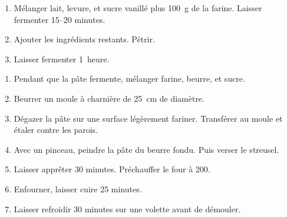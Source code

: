 

\begin{ingredients}
\end{ingredients}



\begin{recipe}
  \begin{enumerate}

  \item Mélanger lait, levure, et sucre vanillé plus 100~g de la
    farine.  Laisser fermenter 15--20 minutes.

  \item Ajouter les ingrédients restants.  Pétrir.

  \item Laisser fermenter 1~heure.

  \end{enumerate}
\end{recipe}


\begin{ingredients}
\end{ingredients}


\begin{recipe}
  \begin{enumerate}

  \item Pendant que la pâte fermente, mélanger farine, beurre, et sucre.

  \item Beurrer un moule à charnière de 25~cm de diamètre.

  \item Dégazer la pâte sur une surface légèrement fariner.
    Transférer au moule et étaler contre les parois.

  \item Avec un pinceau, peindre la pâte du beurre fondu.  Puis verser le streusel.

  \item Laisser apprêter 30 minutes.  Préchauffer le four à 200\degreeC.

  \item Enfourner, laisser cuire 25 minutes.

  \item Laisser refroidir 30 minutes sur une volette avant de démouler.

  \end{enumerate}
\end{recipe}


